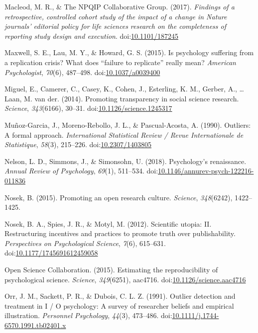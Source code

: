 \documentclass[english,,man]{apa6}
\theoremstyle{definition}
\theoremstyle{definition}
\theoremstyle{definition}
\theoremstyle{remark}
\begin{document}
\hypertarget{ref-Macleod2017}{}
Macleod, M. R., \& The NPQIP Collaborative Group. (2017). \emph{Findings
of a retrospective, controlled cohort study of the impact of a change in
Nature journals' editorial policy for life sciences research on the
completeness of reporting study design and execution}.
doi:\href{https://doi.org/10.1101/187245}{10.1101/187245}

\hypertarget{ref-Maxwell2015}{}
Maxwell, S. E., Lau, M. Y., \& Howard, G. S. (2015). Is psychology
suffering from a replication crisis? What does ``failure to replicate''
really mean? \emph{American Psychologist}, \emph{70}(6), 487--498.
doi:\href{https://doi.org/10.1037/a0039400}{10.1037/a0039400}

\hypertarget{ref-Miguel2014}{}
Miguel, E., Camerer, C., Casey, K., Cohen, J., Esterling, K. M., Gerber,
A., \ldots{} Laan, M. van der. (2014). Promoting transparency in social
science research. \emph{Science}, \emph{343}(6166), 30--31.
doi:\href{https://doi.org/10.1126/science.1245317}{10.1126/science.1245317}

\hypertarget{ref-Munoz-Garcia1990}{}
Muñoz-Garcia, J., Moreno-Rebollo, J. L., \& Pascual-Acosta, A. (1990).
Outliers: A formal approach. \emph{International Statistical Review /
Revue Internationale de Statistique}, \emph{58}(3), 215--226.
doi:\href{https://doi.org/10.2307/1403805}{10.2307/1403805}

\hypertarget{ref-Nelson2018}{}
Nelson, L. D., Simmons, J., \& Simonsohn, U. (2018). Psychology's
renaissance. \emph{Annual Review of Psychology}, \emph{69}(1), 511--534.
doi:\href{https://doi.org/10.1146/annurev-psych-122216-011836}{10.1146/annurev-psych-122216-011836}

\hypertarget{ref-Nosek2015b}{}
Nosek, B. (2015). Promoting an open research culture. \emph{Science},
\emph{348}(6242), 1422--1425.

\hypertarget{ref-Nosek2012c}{}
Nosek, B. A., Spies, J. R., \& Motyl, M. (2012). Scientific utopia: II.
Restructuring incentives and practices to promote truth over
publishability. \emph{Perspectives on Psychological Science},
\emph{7}(6), 615--631.
doi:\href{https://doi.org/10.1177/1745691612459058}{10.1177/1745691612459058}

\hypertarget{ref-ScienceCollaboration2015}{}
Open Science Collaboration. (2015). Estimating the reproducibility of
psychological science. \emph{Science}, \emph{349}(6251), aac4716.
doi:\href{https://doi.org/10.1126/science.aac4716}{10.1126/science.aac4716}

\hypertarget{ref-Orr1991}{}
Orr, J. M., Sackett, P. R., \& Dubois, C. L. Z. (1991). Outlier
detection and treatment in I / O psychology: A survey of researcher
beliefs and empirical illustration. \emph{Personnel Psychology},
\emph{44}(3), 473--486.
doi:\href{https://doi.org/10.1111/j.1744-6570.1991.tb02401.x}{10.1111/j.1744-6570.1991.tb02401.x}
\end{document}
